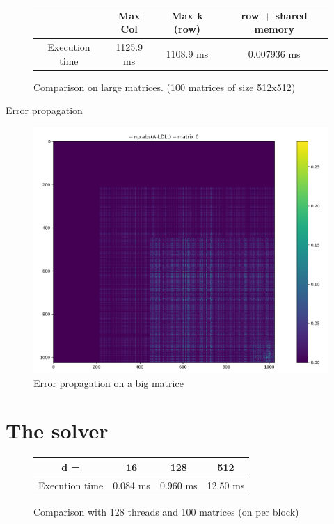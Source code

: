 \documentclass[compress,xcolor=table]{beamer}
\begin{document}
\begin{frame}{}
	
	\begin{figure}
		\begin{tabular}{c|c|c|c}
			& Max Col & Max k (row) & row + shared memory
			\\
			\hline
			Execution time &  1125.9 ms & 1108.9 ms &  0.007936 ms \\
		\end{tabular}
		
		\caption{Comparison on large matrices. (100 matrices of size 512x512)}
	\end{figure}
	
\end{frame}

\begin{frame}{Error propagation}
	\begin{figure}
		\centering
		\includegraphics[scale=0.3]{images/bigerrors.png}
		\caption{Error propagation on a big matrice}
	\end{figure}
\end{frame}

\section{The solver}

\begin{frame}{}
	
	\begin{figure}
		\begin{tabular}{c|c|c|c}
			d = & 16 & 128 & 512  
			\\
			\hline
			Execution time &  0.084 ms & 0.960 ms &  12.50 ms \\
		\end{tabular}
		
		\caption{Comparison with 128 threads and 100 matrices (on per block)}
	\end{figure}
	
\end{frame}
\end{document}
